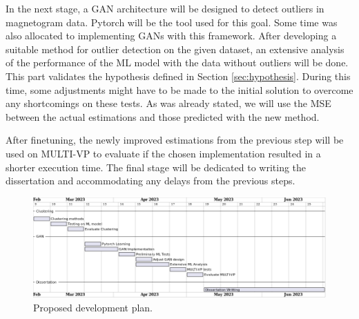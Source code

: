 In the next stage, a GAN architecture will be designed to detect outliers in magnetogram data. Pytorch \cite{NEURIPS2019_9015} will be the tool used for this goal. Some time was also allocated to implementing GANs with this framework. After developing a suitable method for outlier detection on the given dataset, an extensive analysis of the performance of the ML model with the data without outliers will be done. This part validates the hypothesis defined in Section \ref{sec:hypothesis}. During this time, some adjustments might have to be made to the initial solution to overcome any shortcomings on these tests. As was already stated, we will use the MSE between the actual estimations and those predicted with the new method. 

After finetuning, the newly improved estimations from the previous step will be used on MULTI-VP to evaluate if the chosen implementation resulted in a shorter execution time. The final stage will be dedicated to writing the dissertation and accommodating any delays from the previous steps.

\begin{figure}[ht]
\centering
\includegraphics[width=\textwidth]{figures/work_plan.png}
\caption{Proposed development plan.}
\label{fig:work_plan}
\end{figure}
